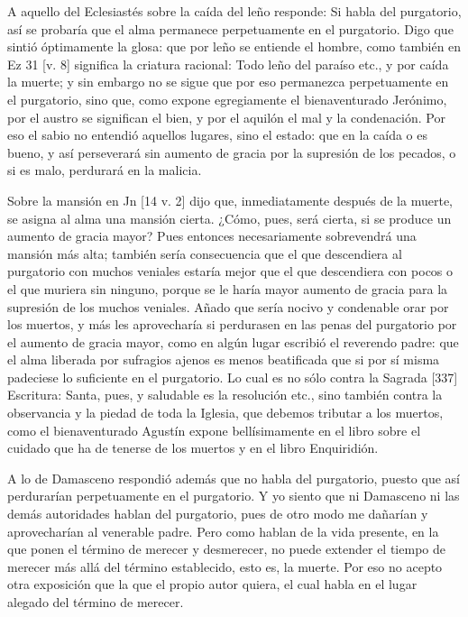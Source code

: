 A aquello del Eclesiastés sobre la caída del leño responde: Si habla del purgatorio, así se probaría que el alma permanece perpetuamente en el purgatorio. Digo que sintió óptimamente la glosa: que por leño se entiende el hombre, como también en Ez 31 [v. 8] significa la criatura racional: Todo leño del paraíso etc., y por caída la muerte; y sin embargo no se sigue que por eso permanezca perpetuamente en el purgatorio, sino que, como expone egregiamente el bienaventurado Jerónimo, por el austro se significan el bien, y por el aquilón el mal y la condenación. Por eso el sabio no entendió aquellos lugares, sino el estado: que en la caída o es bueno, y así perseverará sin aumento de gracia por la supresión de los pecados, o si es malo, perdurará en la malicia.

Sobre la mansión en Jn [14 v. 2] dijo que, inmediatamente después de la muerte, se asigna al alma una mansión cierta. ¿Cómo, pues, será cierta, si se produce un aumento de gracia mayor? Pues entonces necesariamente sobrevendrá una mansión más alta; también sería consecuencia que el que descendiera al purgatorio con muchos veniales estaría mejor que el que descendiera con pocos o el que muriera sin ninguno, porque se le haría mayor aumento de gracia para la supresión de los muchos veniales. Añado que sería nocivo y condenable orar por los muertos, y más les aprovecharía si perdurasen en las penas del purgatorio por el aumento de gracia mayor, como en algún lugar escribió el reverendo padre: que el alma liberada por sufragios ajenos es menos beatificada que si por sí misma padeciese lo suficiente en el purgatorio. Lo cual es no sólo contra la Sagrada [337] Escritura: Santa, pues, y saludable es la resolución etc., sino también contra la observancia y la piedad de toda la Iglesia, que debemos tributar a los muertos, como el bienaventurado Agustín expone bellísimamente en el libro sobre el cuidado que ha de tenerse de los muertos y en el libro Enquiridión.

A lo de Damasceno respondió además que no habla del purgatorio, puesto que así perdurarían perpetuamente en el purgatorio. Y yo siento que ni Damasceno ni las demás autoridades hablan del purgatorio, pues de otro modo me dañarían y aprovecharían al venerable padre. Pero como hablan de la vida presente, en la que ponen el término de merecer y desmerecer, no puede extender el tiempo de merecer más allá del término establecido, esto es, la muerte. Por eso no acepto otra exposición que la que el propio autor quiera, el cual habla en el lugar alegado del término de merecer.

